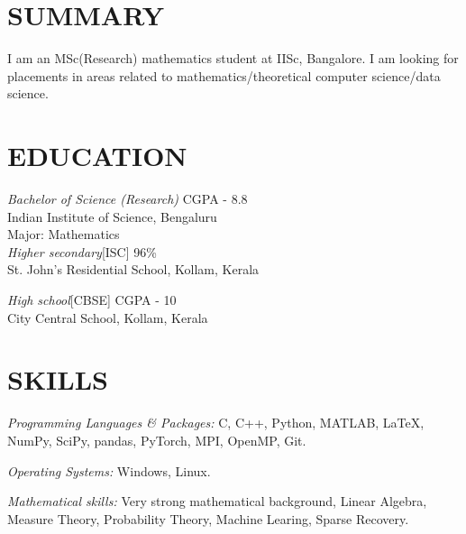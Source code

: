 \documentclass[margin, 10pt]{res} %
\begin{document}
\begin{resume}

 
\section{SUMMARY}  

	I am an MSc(Research) mathematics student at IISc, Bangalore.
	I am looking for placements in areas related to
	mathematics/theoretical computer science/data science.


\section{EDUCATION}
{\sl Bachelor of Science (Research)} \hfill CGPA - 8.8\\
Indian Institute of Science, Bengaluru\\
Major: Mathematics\\

{\sl Higher secondary}[ISC]  \hfill  96\%\\
St. John's Residential School, Kollam, Kerala

{\sl High school}[CBSE] \hfill CGPA - 10\\
City Central School, Kollam, Kerala 


\section{SKILLS} 

{\sl Programming Languages \& Packages:} 
 C, C++, Python, MATLAB, \LaTeX,
	NumPy, SciPy, pandas, PyTorch, MPI, OpenMP, Git.

{\sl Operating Systems:} Windows, Linux.

{\sl Mathematical skills:} Very strong mathematical background,
	Linear Algebra, Measure Theory, Probability Theory,
	Machine Learing, Sparse Recovery.


\end{resume}
\end{document}

